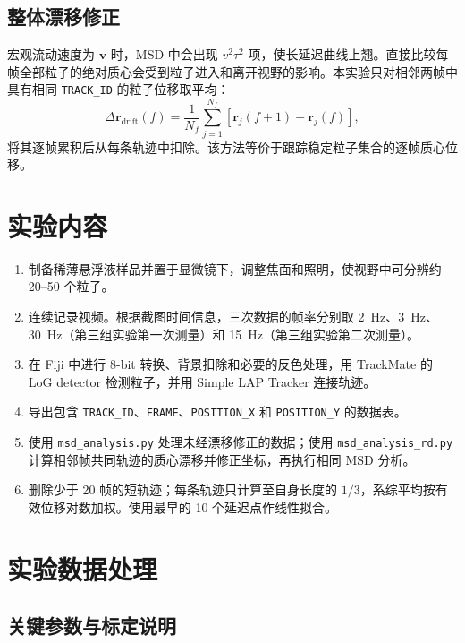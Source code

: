 \documentclass[11pt]{article}
\begin{document}
\subsection{整体漂移修正}

宏观流动速度为 $\bm v$ 时，MSD 中会出现 $v^2\tau^2$ 项，使长延迟曲线上翘。直接比较每帧全部粒子的绝对质心会受到粒子进入和离开视野的影响。本实验只对相邻两帧中具有相同 \texttt{TRACK\_ID} 的粒子位移取平均：
\begin{equation}
    \Delta\bm r_{\mathrm{drift}}(f)
    =\frac{1}{N_f}\sum_{j=1}^{N_f}
    [\bm r_j(f+1)-\bm r_j(f)],
\end{equation}
将其逐帧累积后从每条轨迹中扣除。该方法等价于跟踪稳定粒子集合的逐帧质心位移。

\section{实验内容}

\begin{enumerate}
    \item 制备稀薄悬浮液样品并置于显微镜下，调整焦面和照明，使视野中可分辨约 20--50 个粒子。
    \item 连续记录视频。根据截图时间信息，三次数据的帧率分别取 \SI{2}{Hz}、\SI{3}{Hz}、\SI{30}{Hz}（第三组实验第一次测量）和 \SI{15}{Hz}（第三组实验第二次测量）。
    \item 在 Fiji 中进行 8-bit 转换、背景扣除和必要的反色处理，用 TrackMate 的 LoG detector 检测粒子，并用 Simple LAP Tracker 连接轨迹。
    \item 导出包含 \texttt{TRACK\_ID}、\texttt{FRAME}、\texttt{POSITION\_X} 和 \texttt{POSITION\_Y} 的数据表。
    \item 使用 \texttt{msd\_analysis.py} 处理未经漂移修正的数据；使用 \texttt{msd\_analysis\_rd.py} 计算相邻帧共同轨迹的质心漂移并修正坐标，再执行相同 MSD 分析。
    \item 删除少于 20 帧的短轨迹；每条轨迹只计算至自身长度的 $1/3$，系综平均按有效位移对数加权。使用最早的 10 个延迟点作线性拟合。
\end{enumerate}

\section{实验数据处理}

\subsection{关键参数与标定说明}
\end{document}
